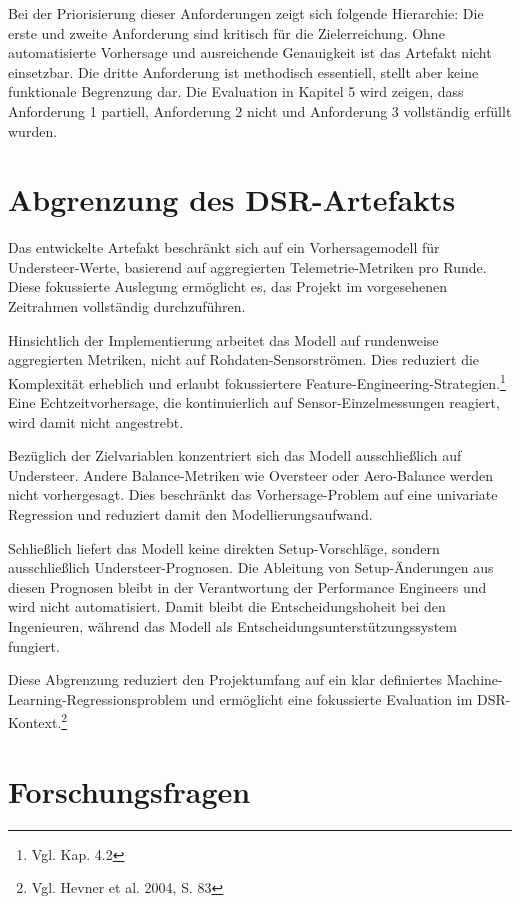 Bei der Priorisierung dieser Anforderungen zeigt sich folgende Hierarchie: Die erste und zweite Anforderung sind kritisch für die Zielerreichung. Ohne automatisierte Vorhersage und ausreichende Genauigkeit ist das Artefakt nicht einsetzbar. Die dritte Anforderung ist methodisch essentiell, stellt aber keine funktionale Begrenzung dar. Die Evaluation in Kapitel 5 wird zeigen, dass Anforderung 1 partiell, Anforderung 2 nicht und Anforderung 3 vollständig erfüllt wurden.



\section{Abgrenzung des DSR-Artefakts}

Das entwickelte Artefakt beschränkt sich auf ein Vorhersagemodell für Understeer-Werte, basierend auf aggregierten Telemetrie-Metriken pro Runde. Diese fokussierte Auslegung ermöglicht es, das Projekt im vorgesehenen Zeitrahmen vollständig durchzuführen.

Hinsichtlich der Implementierung arbeitet das Modell auf rundenweise aggregierten Metriken, nicht auf Rohdaten-Sensorströmen. Dies reduziert die Komplexität erheblich und erlaubt fokussiertere Feature-Engineering-Strategien.\footnote{Vgl. Kap. 4.2} Eine Echtzeitvorhersage, die kontinuierlich auf Sensor-Einzelmessungen reagiert, wird damit nicht angestrebt.

Bezüglich der Zielvariablen konzentriert sich das Modell ausschließlich auf Understeer. Andere Balance-Metriken wie Oversteer oder Aero-Balance werden nicht vorhergesagt. Dies beschränkt das Vorhersage-Problem auf eine univariate Regression und reduziert damit den Modellierungsaufwand.

Schließlich liefert das Modell keine direkten Setup-Vorschläge, sondern ausschließlich Understeer-Prognosen. Die Ableitung von Setup-Änderungen aus diesen Prognosen bleibt in der Verantwortung der Performance Engineers und wird nicht automatisiert. Damit bleibt die Entscheidungshoheit bei den Ingenieuren, während das Modell als Entscheidungsunterstützungssystem fungiert.

Diese Abgrenzung reduziert den Projektumfang auf ein klar definiertes Machine-Learning-Regressionsproblem und ermöglicht eine fokussierte Evaluation im DSR-Kontext.\footnote{Vgl. Hevner et al. 2004, S. 83}



\section{Forschungsfragen}

